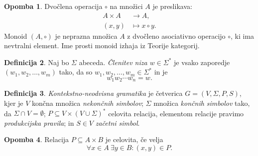 \documentclass{amsart}
\theoremstyle{definition}
\newtheorem{definicija}{Definicija}[section]
\newtheorem{opomba}[definicija]{Opomba}
\theoremstyle{plain} %
\begin{document}
\begin{opomba}
    
    Dvočlena operacija $ \circ $ na množici $ A $ je preslikava:
    \begin{align*}
        A \times A &\to A, \\
        (x,y) &\mapsto x \circ y.
    \end{align*}
    Monoid $ (A, \circ) $ je neprazna množica $ A $ z dvočleno asociativno operacijo $ \circ $,
    ki ima nevtralni element. Ime prosti monoid izhaja iz Teorije kategorij.

\end{opomba}

\begin{definicija}

    Naj bo $ \Sigma $ abeceda. \textit{Členitev niza $ w \in \Sigma^*$} je vsako zaporedje $ (w_1, w_2, \ldots, w_m ) $ tako,
    da so $ w_1, w_2, \ldots, w_m \in \Sigma^* $ in je
    \[
        w_1w_2 \cdots w_n = w.
    \]

\end{definicija}

\begin{definicija}

    \textit{Kontekstno-neodvisna gramatika} je četverica $ G = (V, \Sigma, P, S) $, kjer je
    $ V $ končna množica \textit{nekončnih simbolov}; $ \Sigma $ množica \textit{končnih simbolov}
    tako, da $ \Sigma \cap V = \emptyset $; $ P \subseteq V \times ( V \cup \Sigma )^* $ celovita relacija,
    elementom relacije pravimo \textit{produkcijska pravila}; in $ S \in V $ \textit{začetni simbol}.

\end{definicija}

    


\begin{opomba}
    
    Relacija $ P \subseteq A \times B $ je celovita, če velja
    \[
        \forall x \in A \ \exists y \in B \colon (x,y) \in P.
    \]

\end{opomba}
\end{document}
